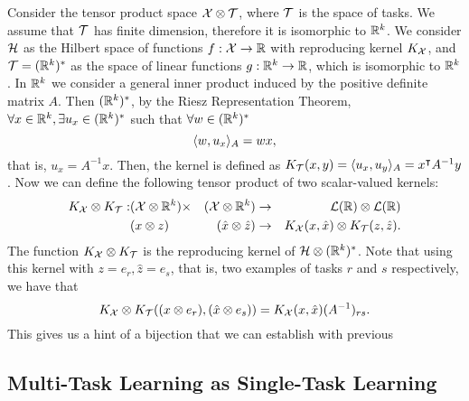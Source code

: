 Consider the tensor product space $\mathcal{X} \otimes \mathcal{T}$, where $\mathcal{T}$ is the space of tasks. We assume that $\mathcal{T}$ has finite dimension, therefore it is isomorphic to $\mathbb{R}^k$. We consider $\mathcal{H}$ as the Hilbert space of functions $f: \mathcal{X} \to \mathbb{R}$ with reproducing kernel $K_{\mathcal{X}}$, and $\mathcal{T} = (\mathbb{R}^k)^*$ as the space of linear functions $g: \mathbb{R}^k \to \mathbb{R}$, which is isomorphic to $\mathbb{R}^k$. In $\mathbb{R}^k$ we consider a general inner product induced by the positive definite matrix $A$.
Then $(\mathbb{R}^k)^*$, by the Riesz Representation Theorem, $ \forall x \in \mathbb{R}^k, \exists u_x \in (\mathbb{R}^k)^*$ such that $\forall w \in (\mathbb{R}^k)^*$ 
$$ \langle w, u_x \rangle_A = w x, $$
that is, $u_x = A^{-1}x$.
Then, the kernel is defined as
$K_{\mathcal{T}}(x, y) = \langle u_x, u_y \rangle_A = x^\intercal A^{-1} y$.
Now we can define the following tensor product of two scalar-valued kernels:   
\begin{equation}
    \nonumber
    \begin{aligned}
        K_{\mathcal{X}} \otimes K_{\mathcal{T}}: &(\mathcal{X} \otimes \mathbb{R}^k) \times &(\mathcal{X} \otimes \mathbb{R}^k) &\to & \mathcal{L}(\mathbb{R}) \otimes \mathcal{L}(\mathbb{R}) \\
    &(x \otimes z) &(\hat{x} \otimes \hat{z}) &\to & K_{\mathcal{X}}(x, \hat{x}) \otimes K_{\mathcal{T}}(z, \hat{z}).
    \end{aligned}
\end{equation}
The function $K_{\mathcal{X}} \otimes K_{\mathcal{T}}$ is the reproducing kernel of $\mathcal{H} \otimes (\mathbb{R}^k)^*$.
%
Note that using this kernel with $z=e_r, \hat{z}=e_s$, that is, two examples of tasks $r$ and $s$ respectively, we have that
$$ K_{\mathcal{X}} \otimes K_{\mathcal{T}}((x \otimes e_r) , (\hat{x} \otimes e_s)) = K_{\mathcal{X}}(x, \hat{x}) (A^{-1})_{rs}.$$
This gives us a hint of a bijection that we can establish with previous 


 

\subsection{Multi-Task Learning as Single-Task Learning}


